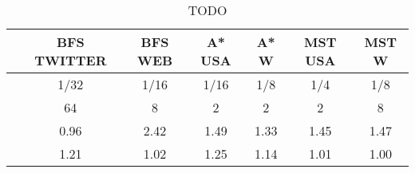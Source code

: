 \begin{table}[h]
\centring
\begin{tabular}{ |c|c|c|c|c|c|c| }
\hline
 & \large{\textbf{BFS TWITTER}} & \large{\textbf{BFS WEB}} & \large{\textbf{A* USA}} & \large{\textbf{A* W}} & \large{\textbf{MST USA}} & \large{\textbf{MST W}} \\
\hline
\insprob{} & 1/32 & 1/16 & 1/16 & 1/8 & 1/4 & 1/8 \\
\hline
\delbatch{} & 64 & 8 & 2 & 2 & 2 & 8 \\
\hline
\speed{} & 0.96 & 2.42 & 1.49 & 1.33 & 1.45 & 1.47 \\
\hline
\workinc{} & 1.21 & 1.02 & 1.25 & 1.14 & 1.01 & 1.00 \\
\hline
\end{tabular}
\vspace{0.3em}
\caption{TODO }
\label{table:todo}
\end{table}
